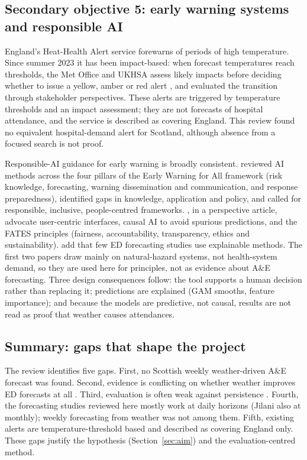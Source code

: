 \documentclass[12pt]{article}
\begin{document}
\subsection{Secondary objective 5: early warning systems and responsible AI}
England's Heat-Health Alert service forewarns of periods of high temperature. Since summer 2023 it has been impact-based: when forecast temperatures reach thresholds, the Met Office and UKHSA assess likely impacts before deciding whether to issue a yellow, amber or red alert \parencite{metoffice_hha}, and \textcite{roberts2025} evaluated the transition through stakeholder perspectives. These alerts are triggered by temperature thresholds and an impact assessment; they are not forecasts of hospital attendance, and the service is described as covering England. This review found no equivalent hospital-demand alert for Scotland, although absence from a focused search is not proof.

Responsible-AI guidance for early warning is broadly consistent. \textcite{tiggeloven2025} reviewed AI methods across the four pillars of the Early Warning for All framework (risk knowledge, forecasting, warning dissemination and communication, and response preparedness), identified gaps in knowledge, application and policy, and called for responsible, inclusive, people-centred frameworks. \textcite{reichstein2025}, in a perspective article, advocate user-centric interfaces, causal AI to avoid spurious predictions, and the FATES principles (fairness, accountability, transparency, ethics and sustainability). \textcite{blanco2026} add that few ED forecasting studies use explainable methods. The first two papers draw mainly on natural-hazard systems, not health-system demand, so they are used here for principles, not as evidence about A\&E forecasting. Three design consequences follow: the tool supports a human decision rather than replacing it; predictions are explained (GAM smooths, feature importance); and because the models are predictive, not causal, results are not read as proof that weather causes attendances.

\subsection{Summary: gaps that shape the project}
The review identifies five gaps. First, no Scottish weekly weather-driven A\&E forecast was found. Second, evidence is conflicting on whether weather improves ED forecasts at all \parencite{marcilio2013,blanco2026}. Third, evaluation is often weak against persistence \parencite{garciacrespi2026}. Fourth, the forecasting studies reviewed here mostly work at daily horizons (Jilani also at monthly); weekly forecasting from weather was not among them. Fifth, existing alerts are temperature-threshold based and described as covering England only. These gaps justify the hypothesis (Section~\ref{sec:aim}) and the evaluation-centred method.
\end{document}
